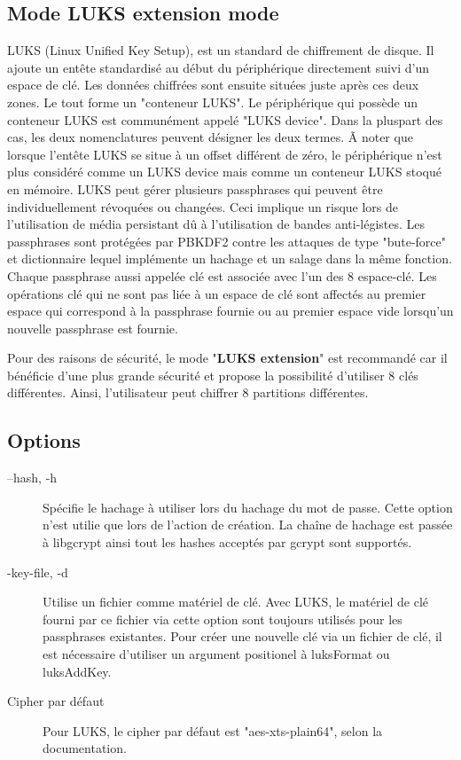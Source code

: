 \subsection{Mode LUKS extension mode}
LUKS (Linux Unified Key Setup), est un standard de chiffrement de disque. Il ajoute un entête standardisé au début du périphérique directement suivi d'un espace de clé. Les données chiffrées sont ensuite situées juste après ces deux zones. Le tout forme un "conteneur LUKS". Le périphérique qui possède un conteneur LUKS est communément appelé "LUKS device". Dans la pluspart des cas, les deux nomenclatures peuvent désigner les deux termes. Ã noter que lorsque l'entête LUKS se situe à un offset différent de zéro, le périphérique n'est plus considéré comme un LUKS device mais comme un conteneur LUKS stoqué en mémoire. LUKS peut gérer plusieurs passphrases qui peuvent être individuellement révoquées ou changées. Ceci implique un risque lors de l'utilisation de média persistant dû à l'utilisation de  bandes anti-légistes. Les passphrases sont protégées par PBKDF2 contre les attaques de type "bute-force" et dictionnaire lequel implémente un hachage et un salage dans la même fonction. Chaque passphrase aussi appelée clé est associée avec l'un des 8 espace-clé. Les opérations clé qui ne sont pas liée à un espace de clé sont affectés au premier espace qui correspond à la passphrase fournie ou au premier espace vide lorsqu'un nouvelle passphrase est fournie.

Pour des raisons de sécurité, le mode "\textbf{LUKS extension}" est recommandé car il bénéficie d'une plus grande sécurité et propose la possibilité d'utiliser 8 clés différentes. Ainsi, l'utilisateur peut chiffrer 8 partitions différentes.

\subsection{Options}
\begin{description}
	\item[--hash, -h] Spécifie le hachage à utiliser lors du hachage du mot de passe. Cette option n'est utilie que lors de l'action de création. La chaîne de hachage est passée à libgcrypt ainsi tout les hashes acceptés par gcrypt sont supportés.
	\item[-key-file, -d] Utilise un fichier comme matériel de clé. Avec LUKS, le matériel de clé fourni par ce fichier via cette option sont toujours utilisés pour les passphrases existantes. Pour créer une nouvelle clé via un fichier de clé, il est nécessaire d'utiliser un argument positionel à luksFormat ou luksAddKey.
	\item[Cipher par défaut] Pour LUKS, le cipher par défaut est "aes-xts-plain64", selon la documentation.
\end{description}


